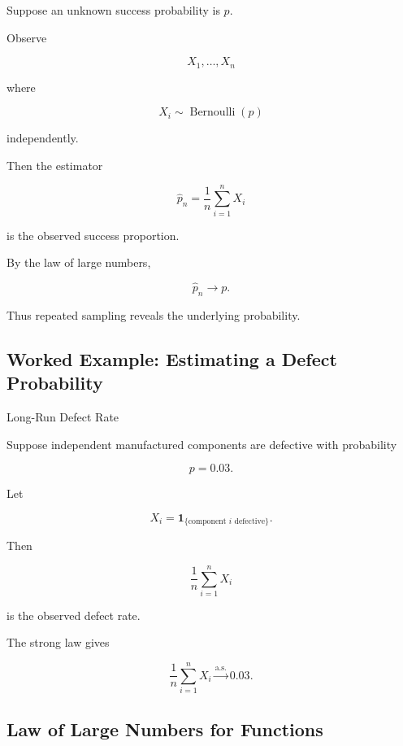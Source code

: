 Suppose an unknown success probability is \(p\).

Observe

\[
X_1,\ldots,X_n
\]

where

\[
X_i\sim\operatorname{Bernoulli}(p)
\]

independently.

Then the estimator

\[
\boxed{
\widehat{p}_n
=
\frac1n
\sum_{i=1}^{n}X_i
}
\]

is the observed success proportion.

By the law of large numbers,

\[
\boxed{
\widehat{p}_n
\to p.
}
\]

Thus repeated sampling reveals the underlying probability.

\subsection{Worked Example: Estimating a Defect Probability}
\label{subsec:worked-defect-frequency}

\begin{workedexamplebox}{Long-Run Defect Rate}

Suppose independent manufactured components are defective with
probability

\[
p=0.03.
\]

Let

\[
X_i
=
\mathbf{1}_{\{\text{component \(i\) defective}\}}.
\]

Then

\[
\frac1n
\sum_{i=1}^{n}X_i
\]

is the observed defect rate.

The strong law gives

\begin{answerbox}
\[
\boxed{
\frac1n
\sum_{i=1}^{n}X_i
\xrightarrow{\text{a.s.}}
0.03.
}
\]
\end{answerbox}

\end{workedexamplebox}

\subsection{Law of Large Numbers for Functions}
\label{subsec:lln-functions}

